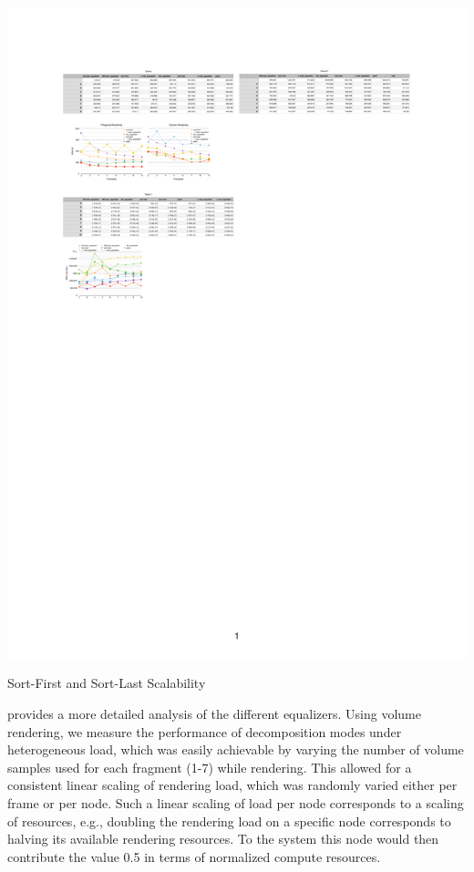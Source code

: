 \begin{benchmark}[h!t]
  \includegraphics[width=\textwidth]{results/compounds}
  \caption{\label{rCompounds}Sort-First and Sort-Last Scalability}
\end{benchmark}

 provides a more detailed analysis of the different
equalizers. Using volume rendering, we measure the performance of decomposition
modes under heterogeneous load, which was easily achievable by varying the
number of volume samples used for each fragment (1-7) while rendering. This
allowed for a consistent linear scaling of rendering load, which was randomly
varied either per frame or per node. Such a linear scaling of load per node
corresponds to a scaling of resources, e.g., doubling the rendering load on a
specific node corresponds to halving its available rendering resources. To the
system this node would then contribute the value 0.5 in terms of normalized
compute resources.

